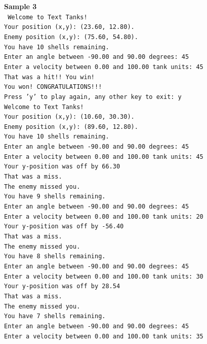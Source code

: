 \documentclass{article}
\begin{document}
\textbf{Sample 3}\\
\texttt{
Welcome to Text Tanks!\\
Your position (x,y):  (23.60, 12.80).\\
Enemy position (x,y): (75.60, 54.80).\\
You have 10 shells remaining.\\
Enter an angle between -90.00 and 90.00 degrees: 45\\
Enter a velocity between 0.00 and 100.00 tank units: 45\\
That was a hit!!  You win!\\
You won!  CONGRATULATIONS!!!\\
Press 'y' to play again, any other key to exit: y\\
Welcome to Text Tanks!\\
Your position (x,y):  (10.60, 30.30).\\
Enemy position (x,y): (89.60, 12.80).\\
You have 10 shells remaining.\\
Enter an angle between -90.00 and 90.00 degrees: 45\\
Enter a velocity between 0.00 and 100.00 tank units: 45\\
Your y-position was off by 66.30\\
That was a miss.\\
The enemy missed you.\\
You have 9 shells remaining.\\
Enter an angle between -90.00 and 90.00 degrees: 45\\
Enter a velocity between 0.00 and 100.00 tank units: 20\\
Your y-position was off by -56.40\\
That was a miss.\\
The enemy missed you.\\
You have 8 shells remaining.\\
Enter an angle between -90.00 and 90.00 degrees: 45\\
Enter a velocity between 0.00 and 100.00 tank units: 30\\
Your y-position was off by 28.54\\
That was a miss.\\
The enemy missed you.\\
You have 7 shells remaining.\\
Enter an angle between -90.00 and 90.00 degrees: 45\\
Enter a velocity between 0.00 and 100.00 tank units: 35\\
}
\end{document}
